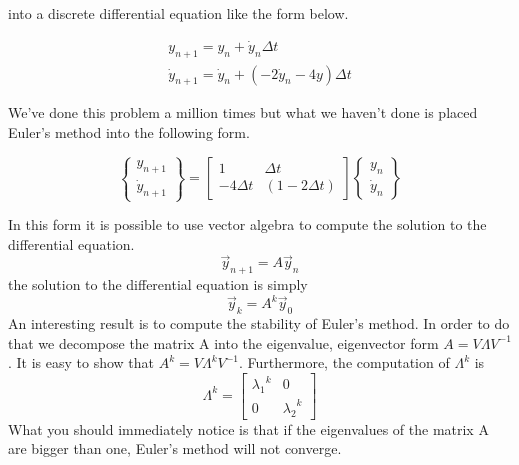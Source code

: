 \begin{enumerate}
  into a discrete differential equation like the form below.

  \begin{equation}
    \begin{matrix}
      {y}_{n+1} = {y}_n + \dot{y}_n\Delta t \\
      \dot{y}_{n+1} = \dot{y}_n + (-2\dot{y}_n - 4y)\Delta t
    \end{matrix}
  \end{equation}

  We've done this problem a
  million times but what we haven't done is placed Euler's method into
  the following form. 

  \begin{equation}
    \begin{Bmatrix}
      y_{n+1} \\ \dot{y}_{n+1} \end{Bmatrix} = \begin{bmatrix} 1 & \Delta t
      \\ -4\Delta t & (1-2\Delta t) \end{bmatrix} \begin{Bmatrix} y_{n}
      \\ \dot{y}_n \end{Bmatrix}
  \end{equation}

  In this form it is possible to use vector algebra to compute the
  solution to the differential equation. 
  \begin{equation}
    \vec{y}_{n+1} = A\vec{y}_n
  \end{equation}
  the solution to the differential equation is simply
  \begin{equation}
    \vec{y}_{k} = A^k\vec{y}_0
  \end{equation}
  An interesting result is to compute the stability of Euler's
  method. In order to do that we decompose the matrix A into the
  eigenvalue, eigenvector form $A=V \Lambda V^{-1}$. It is easy to show
  that $A^k = V \Lambda^k V^{-1}$. Furthermore, the computation of
  $\Lambda^k$ is 
  \begin{equation}
    \Lambda^{k} = \begin{bmatrix} {\lambda_1}^k & 0 \\ 0 & {\lambda_2}^k \end{bmatrix}
  \end{equation}
  What you should immediately notice is that if the eigenvalues of the
  matrix A are bigger than one, Euler's method will not converge.


\end{enumerate}
